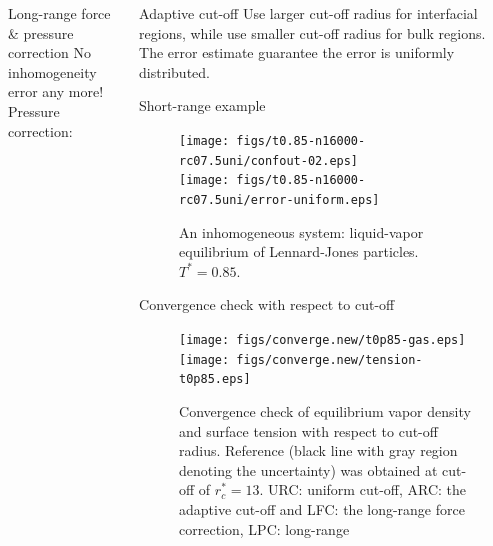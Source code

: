\documentclass[final,hyperref={pdfpagelabels=false},fleqn]{beamer}
\begin{document}
\begin{frame}{}
\begin{columns}[t]
\begin{column}{.48\linewidth}
\begin{block}{Long-range force \& pressure correction}
        No inhomogeneity error any more! Pressure correction:
      \end{block}
    \end{column}
    \begin{column}{.48\linewidth}
      \begin{block}{Adaptive cut-off}
        Use larger cut-off radius for interfacial regions, while use smaller
        cut-off radius for bulk regions. The error estimate guarantee the error
        is uniformly distributed.
      \end{block}
      \begin{block}{Short-range example}
        \begin{figure}
          \centering
          \texttt{[image: figs/t0.85-n16000-rc07.5uni/confout-02.eps]}\\
          \texttt{[image: figs/t0.85-n16000-rc07.5uni/error-uniform.eps]}
          \caption{An inhomogeneous system: liquid-vapor equilibrium of Lennard-Jones particles.
            $T^\ast = 0.85$.}
        \end{figure}
      \end{block}
      \begin{block}{Convergence check with respect to cut-off}
        \begin{figure}
          \centering
          \texttt{[image: figs/converge.new/t0p85-gas.eps]}\\
          \texttt{[image: figs/converge.new/tension-t0p85.eps]} 
          \caption{Convergence check of equilibrium vapor density and
            surface tension with respect to cut-off radius.
            Reference (black line with gray region denoting the
            uncertainty) was obtained at cut-off of $r^\ast_c =
            13$. URC: uniform cut-off, ARC: the adaptive cut-off and
            LFC: the long-range force correction, LPC: long-range
}
\end{figure}
\end{block}
\end{column}
\end{columns}
\end{frame}
\end{document}
